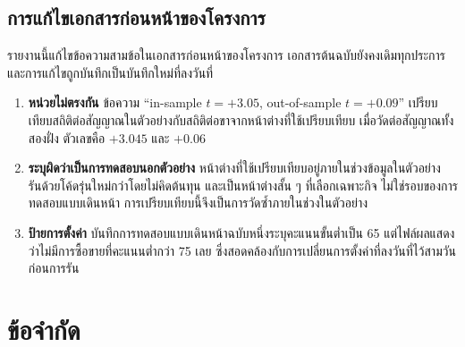 \documentclass[11pt,a4paper]{article}
\newcommand{\tw}[1]{\texorpdfstring{\hspace{0pt}\mbox{#1}\hspace{0pt}}{#1}}
\begin{document}
\subsection{การแก้ไขเอกสารก่อนหน้าของโครงการ}
\label{sec:corrections}
รายงานนี้แก้ไขข้อความสามข้อในเอกสารก่อนหน้าของโครงการ เอกสารต้นฉบับยังคงเดิมทุกประการ
และการแก้ไขถูกบันทึกเป็นบันทึกใหม่ที่ลงวันที่
\begin{enumerate}
\item \textbf{หน่วยไม่ตรงกัน} ข้อความ ``in-sample $t=+3.05$, out-of-sample $t=+0.09$''
เปรียบเทียบสถิติต่อสัญญาณในตัวอย่างกับสถิติต่อขาจากหน้าต่างที่ใช้เปรียบเทียบ
เมื่อวัดต่อสัญญาณทั้งสองฝั่ง ตัวเลขคือ $+3.045$ และ $+0.06$ %
\item \textbf{ระบุผิดว่าเป็นการทดสอบนอกตัวอย่าง} หน้าต่างที่ใช้เปรียบเทียบอยู่ภายในช่วงข้อมูลในตัวอย่าง
รันด้วยโค้ดรุ่นใหม่กว่าโดยไม่คิดต้นทุน และเป็นหน้าต่างสั้น ๆ ที่เลือกเฉพาะกิจ
ไม่ใช่รอบของการทดสอบแบบเดินหน้า การเปรียบเทียบนี้จึงเป็นการวัดซ้ำภายในช่วงในตัวอย่าง %
\item \textbf{ป้ายการตั้งค่า} บันทึกการทดสอบแบบเดินหน้าฉบับหนึ่งระบุคะแนนขั้นต่ำเป็น 65
แต่ไฟล์ผลแสดงว่าไม่มีการ\tw{ซื้อขาย}ที่คะแนน\tw{ต่ำกว่า} 75 เลย
ซึ่งสอดคล้องกับการเปลี่ยนการตั้งค่าที่ลงวันที่ไว้สามวันก่อนการรัน %
\end{enumerate}

\section{ข้อจำกัด}
\label{sec:limits}
\end{document}
